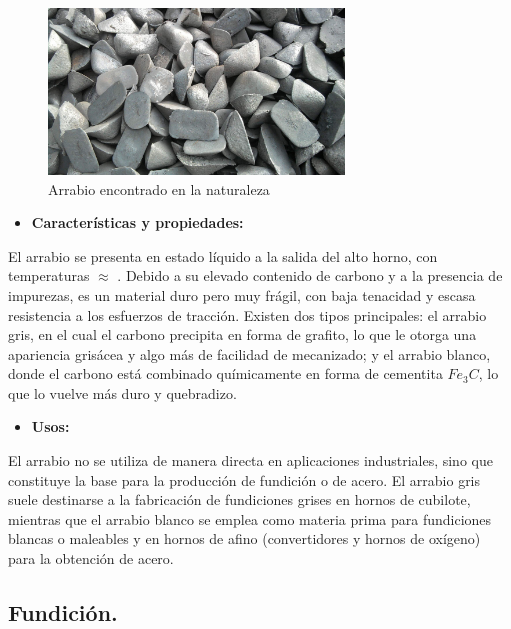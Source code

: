 \documentclass[12pt,a4paper]{article}
\begin{document}
\begin{figure}[H]    
    \centering         
    \includegraphics[width=0.7\textwidth]{Inagenes para latex/1 Arrabio.jpg}
    \caption{Arrabio encontrado en la naturaleza}
\end{figure}

\begin{itemize}
    \item \textbf{Características y propiedades:}
\end{itemize}

El arrabio se presenta en estado líquido a la salida del alto horno, con temperaturas $\approx$  . Debido a su elevado contenido de carbono y a la presencia de impurezas, es un material duro pero muy frágil, con baja tenacidad y escasa resistencia a los esfuerzos de tracción. Existen dos tipos principales: el arrabio gris, en el cual el carbono precipita en forma de grafito, lo que le otorga una apariencia grisácea y algo más de facilidad de mecanizado; y el arrabio blanco, donde el carbono está combinado químicamente en forma de cementita $Fe_3C$, lo que lo vuelve más duro y quebradizo.

\begin{itemize}
    \item \textbf{Usos:}
\end{itemize}

El arrabio no se utiliza de manera directa en aplicaciones industriales, sino que constituye la base para la producción de fundición o de acero. El arrabio gris suele destinarse a la fabricación de fundiciones grises en hornos de cubilote, mientras que el arrabio blanco se emplea como materia prima para fundiciones blancas o maleables y en hornos de afino (convertidores y hornos de oxígeno) para la obtención de acero.

\subsection{Fundición.}
\end{document}
